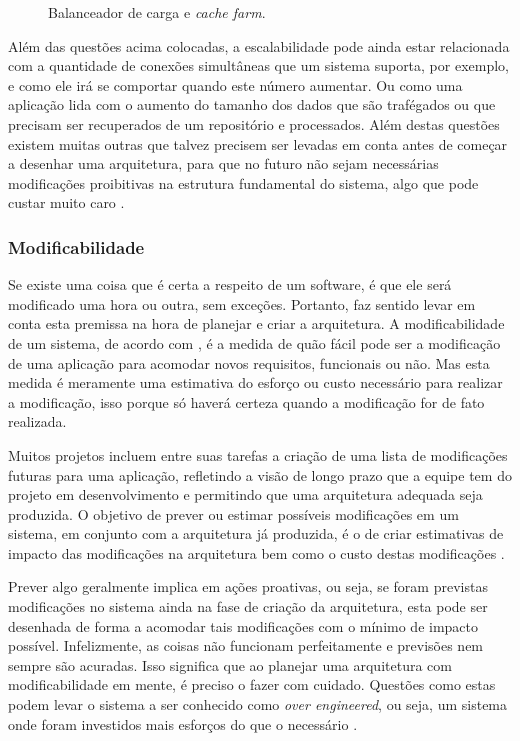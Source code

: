 \documentclass[diss]{template/setrem}
\begin{document}
\begin{figure}[!h]
    \caption{Balanceador de carga e \emph{cache farm}.}
    \label{fig:load-balancer}
\end{figure}

Além das questões acima colocadas, a escalabilidade pode ainda estar relacionada com a quantidade de conexões simultâneas que um sistema suporta, por exemplo, e como ele irá se comportar quando este número aumentar. Ou como uma aplicação lida com o aumento do tamanho dos dados que são trafégados ou que precisam ser recuperados de um repositório e processados. Além destas questões existem muitas outras que talvez precisem ser levadas em conta antes de começar a desenhar uma arquitetura, para que no futuro não sejam necessárias modificações proibitivas na estrutura fundamental do sistema, algo que pode custar muito caro \citep{Gorton2011}.

\subsubsection{Modificabilidade}
Se existe uma coisa que é certa a respeito de um software, é que ele será modificado uma hora ou outra, sem exceções. Portanto, faz sentido levar em conta esta premissa na hora de planejar e criar a arquitetura. A modificabilidade de um sistema, de acordo com \citet{Gorton2011}, é a medida de quão fácil pode ser a modificação de uma aplicação para acomodar novos requisitos, funcionais ou não. Mas esta medida é meramente uma estimativa do esforço ou custo necessário para realizar a modificação, isso porque só haverá certeza quando a modificação for de fato realizada.

Muitos projetos incluem entre suas tarefas a criação de uma lista de modificações futuras para uma aplicação, refletindo a visão de longo prazo que a equipe tem do projeto em desenvolvimento e permitindo que uma arquitetura adequada seja produzida. O objetivo de prever ou estimar possíveis modificações em um sistema, em conjunto com a arquitetura já produzida, é o de criar estimativas de impacto das modificações na arquitetura bem como o custo destas modificações \citep{Gorton2011}.

Prever algo geralmente implica em ações proativas, ou seja, se foram previstas modificações no sistema ainda na fase de criação da arquitetura, esta pode ser desenhada de forma a acomodar tais modificações com o mínimo de impacto possível. Infelizmente, as coisas não funcionam perfeitamente e previsões nem sempre são acuradas. Isso significa que ao planejar uma arquitetura com modificabilidade em mente, é preciso o fazer com cuidado. Questões como estas podem levar o sistema a ser conhecido como \emph{over engineered}, ou seja, um sistema onde foram investidos mais esforços do que o necessário \citep{Gorton2011}.
\end{document}
